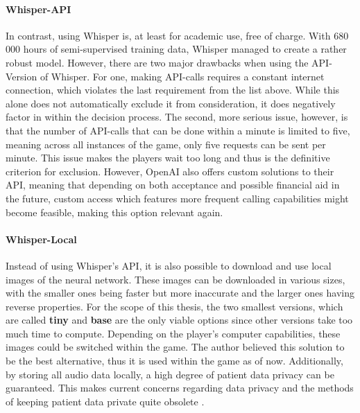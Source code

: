 \documentclass[draft,final]{vutinfth} %
\begin{document}
\paragraph{Whisper-API} In contrast, using Whisper is, at least for academic use, free of charge. With 680 000 hours of semi-supervised training data, Whisper managed to create a rather robust model. However, there are two major drawbacks when using the API-Version of Whisper. For one, making API-calls requires a constant internet connection, which violates the last requirement from the list above. While this alone does not automatically exclude it from consideration, it does negatively factor in within the decision process. The second, more serious issue, however, is that the number of API-calls that can be done within a minute is limited to five, meaning across all instances of the game, only five requests can be sent per minute. This issue makes the players wait too long and thus is the definitive criterion for exclusion. However, OpenAI also offers custom solutions to their API, meaning that depending on both acceptance and possible financial aid in the future, custom access which features more frequent calling capabilities might become feasible, making this option relevant again.

\paragraph{Whisper-Local} Instead of using Whisper's API, it is also possible to download and use local images of the neural network. These images can be downloaded in various sizes, with the smaller ones being faster but more inaccurate and the larger ones having reverse properties. For the scope of this thesis, the two smallest versions, which are called \textbf{tiny} and \textbf{base} are the only viable options since other versions take too much time to compute. Depending on the player's computer capabilities, these images could be switched within the game. The author believed this solution to be the best alternative, thus it is used within the game as of now. Additionally, by storing all audio data locally, a high degree of patient data privacy can be guaranteed. This makes current concerns regarding data privacy and the methods of keeping patient data private quite obsolete \cite{hathaliya2020exhaustive}.
\end{document}
